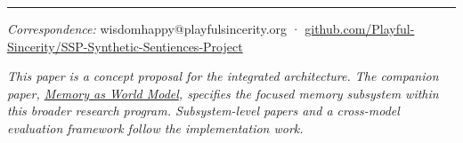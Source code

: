 \documentclass[12pt]{article}
\begin{document}
\begin{center}\rule{0.5\linewidth}{0.5pt}\end{center}

\emph{Correspondence:} wisdomhappy@playfulsincerity.org · \href{https://github.com/Playful-Sincerity/SSP-Synthetic-Sentiences-Project}{github.com/Playful-Sincerity/SSP-Synthetic-Sentiences-Project}

\emph{This paper is a concept proposal for the integrated architecture. The companion paper, \href{https://github.com/Playful-Sincerity/MWM-Memory-as-World-Model}{Memory as World Model}, specifies the focused memory subsystem within this broader research program. Subsystem-level papers and a cross-model evaluation framework follow the implementation work.}
\end{document}
